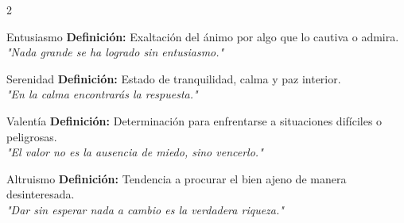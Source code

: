 \documentclass[11pt, a4paper]{article}
\begin{document}
\begin{multicols}{2}
    \begin{tarjeta}{Entusiasmo}
        \textbf{Definición:} Exaltación del ánimo por algo que lo cautiva o admira. \\
        \textit{"Nada grande se ha logrado sin entusiasmo."}
    \end{tarjeta}

    \begin{tarjeta}{Serenidad}
        \textbf{Definición:} Estado de tranquilidad, calma y paz interior. \\
        \textit{"En la calma encontrarás la respuesta."}
    \end{tarjeta}

    \begin{tarjeta}{Valentía}
        \textbf{Definición:} Determinación para enfrentarse a situaciones difíciles o peligrosas. \\
        \textit{"El valor no es la ausencia de miedo, sino vencerlo."}
    \end{tarjeta}

    \begin{tarjeta}{Altruismo}
        \textbf{Definición:} Tendencia a procurar el bien ajeno de manera desinteresada. \\
        \textit{"Dar sin esperar nada a cambio es la verdadera riqueza."}
    \end{tarjeta}

\end{multicols}
\end{document}
